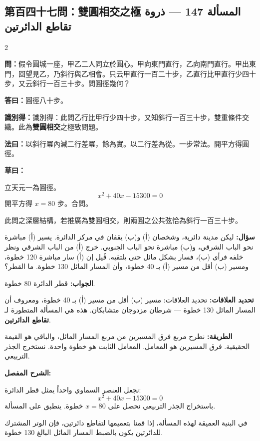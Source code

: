 \documentclass[11pt,a4paper]{article}
\newcommand{\ar}[1]{\arabicfont\beginR #1\endR}
\newcommand{\arb}[1]{\textbf{\arabicfont\beginR #1\endR}}
\newcommand{\arnote}[1]{\textcolor{arabicblue}{\ar{#1}}}
\newcommand{\wen}[1]{\par\noindent\textbf{\textcolor{probcolor}{問：}}{#1}\par}
\newcommand{\da}[1]{\par\noindent\textbf{\textcolor{anscolor}{答曰：}}{#1}\par}
\newcommand{\fayue}[1]{\par\noindent\textbf{\textcolor{methodcolor}{法曰：}}{#1}\par}
\newcommand{\caoyue}[1]{\par\noindent\textbf{草曰：}{#1}\par}
\newcommand{\zhi}[1]{\par\noindent\textbf{識別得：}{#1}\par}
\newcommand{\arwen}[1]{\par\noindent\arb{سؤال: }\arnote{#1}\par}
\newcommand{\arjwb}[1]{\par\noindent\arb{الجواب: }\arnote{#1}\par}
\newcommand{\arqwd}[1]{\par\noindent\arb{الطريقة: }\arnote{#1}\par}
\newcommand{\arshr}[1]{\par\noindent\arb{الشرح المفصل: }\arnote{#1}\par}
\newcommand{\arfl}[1]{\par\noindent\arb{تحديد العلاقات: }\arnote{#1}\par}
\begin{document}
\subsection*{第百四十七問：雙圓相交之極 \hfill \ar{المسألة 147 — ذروة تقاطع الدائرتين}}

\begin{paracol}{2}

\begin{leftcolumn}
\wen{假令圓城一座，甲乙二人同立於圓心。甲向東門直行，乙向南門直行。甲出東門，回望見乙，乃斜行與乙相會。只云甲直行一百二十步，乙直行比甲直行少四十步，又云斜行一百三十步。問圓徑幾何？}

\da{圓徑八十步。}

\zhi{識別得：此問乙行比甲行少四十步，又知斜行一百三十步，雙重條件交織。此為\textbf{雙圓相交}之極致問題。}

\fayue{以斜行冪內減二行差冪，餘為實。以二行差為從。一步常法。開平方得圓徑。}

\caoyue{
立天元一為圓徑。
$$x^2 + 40x - 15300 = 0$$
開平方得 $x = 80$ 步。合問。

此問之深層結構，若推廣為雙圓相交，則兩圓之公共弦恰為斜行一百三十步。}
\end{leftcolumn}

\begin{rightcolumn}
\arwen{ليكن مدينة دائرية، وشخصان (أ) و(ب) يقفان في مركز الدائرة. يسير (أ) مباشرة نحو الباب الشرقي، و(ب) مباشرة نحو الباب الجنوبي. خرج (أ) من الباب الشرقي ونظر خلفه فرأى (ب)، فسار بشكل مائل حتى يلتقيه. قُيل إن (أ) سار مباشرة 120 خطوة، ومسير (ب) أقل من مسير (أ) بـ 40 خطوة، وأن المسار المائل 130 خطوة. ما القطر؟}

\arjwb{قطر الدائرة 80 خطوة.}

\arfl{تحديد العلاقات: مسير (ب) أقل من مسير (أ) بـ 40 خطوة، ومعروف أن المسار المائل 130 خطوة — شرطان مزدوجان متشابكان. هذه هي المسألة المتطورة لـ \textbf{تقاطع الدائرتين}.}

\arqwd{نطرح مربع فرق المسيرين من مربع المسار المائل، والباقي هو القيمة الحقيقية. فرق المسيرين هو المعامل. المعامل الثابت هو خطوة واحدة. نستخرج الجذر التربيعي.}

\arshr{نجعل العنصر السماوي واحداً يمثل قطر الدائرة:
$$x^2 + 40x - 15300 = 0$$
باستخراج الجذر التربيعي نحصل على $x = 80$ خطوة. ينطبق على المسألة.

في البنية العميقة لهذه المسألة، إذا قمنا بتعميمها لتقاطع دائرتين، فإن الوتر المشترك للدائرتين يكون بالضبط المسار المائل البالغ 130 خطوة.}
\end{rightcolumn}

\end{paracol}
\end{document}
